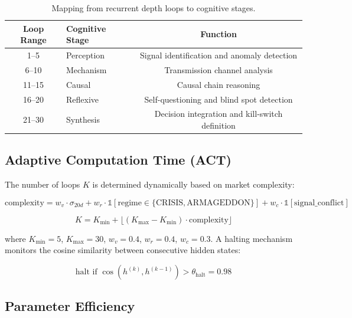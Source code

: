 \documentclass[11pt, a4paper]{article}
\begin{document}
\begin{table}[H]
\centering
\begin{tabular}{clc}
\toprule
\textbf{Loop Range} & \textbf{Cognitive Stage} & \textbf{Function} \\
\midrule
1--5 & Perception & Signal identification and anomaly detection \\
6--10 & Mechanism & Transmission channel analysis \\
11--15 & Causal & Causal chain reasoning \\
16--20 & Reflexive & Self-questioning and blind spot detection \\
21--30 & Synthesis & Decision integration and kill-switch definition \\
\bottomrule
\end{tabular}
\caption{Mapping from recurrent depth loops to cognitive stages.}
\label{tab:cognitive_stages}
\end{table}

\subsection{Adaptive Computation Time (ACT)}

The number of loops $K$ is determined dynamically based on market complexity:

\begin{equation}
  \text{complexity} = w_v \cdot \sigma_{20d} + w_r \cdot \mathbb{1}[\text{regime} \in \{\text{CRISIS}, \text{ARMAGEDDON}\}] + w_c \cdot \mathbb{1}[\text{signal\_conflict}]
\end{equation}

\begin{equation}
  K = K_{\min} + \lfloor (K_{\max} - K_{\min}) \cdot \text{complexity} \rfloor
\end{equation}

where $K_{\min} = 5$, $K_{\max} = 30$, $w_v = 0.4$, $w_r = 0.4$, $w_c = 0.3$. A halting mechanism monitors the cosine similarity between consecutive hidden states:

\begin{equation}
  \text{halt if } \cos(h^{(k)}, h^{(k-1)}) > \theta_{\text{halt}} = 0.98
\end{equation}

\subsection{Parameter Efficiency}
\end{document}
